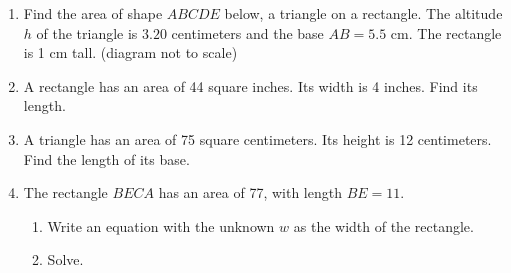 \begin{enumerate}
\item Find the area of shape $ABCDE$ below, a triangle on a rectangle. The altitude $h$ of the triangle is $3.20$ centimeters and the base $AB=5.5$ cm. The rectangle is 1 cm tall. (diagram not to scale) \\[0.5cm]
       \vspace{1.0cm}



\item A rectangle has an area of 44 square inches. Its width is 4 inches. Find its length.
\vspace{2.0cm}

\item A triangle has an area of 75 square centimeters. Its height is 12 centimeters. Find the length of its base.
   
\item The rectangle $BECA$ has an area of 77, with length $BE=11$.
  \begin{enumerate}
    \item Write an equation with the unknown $w$ as the width of the rectangle. 
    \item Solve.
  \end{enumerate}
  \begin{flushright}
  \end{flushright}



\end{enumerate}
